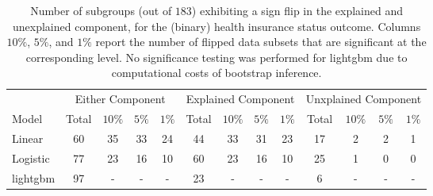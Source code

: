 % 
\begin{table}[!ht]
    \caption{Number of subgroups (out of $183$) exhibiting a sign flip in the explained and unexplained component, for the (binary) health insurance status outcome. Columns $10\%$, $5\%$, and $1\%$ report the number of flipped data subsets that are significant at the corresponding level. No significance testing was performed for lightgbm due to computational costs of bootstrap inference.}
    \label{tab:flips_census_insurance}
    \centering
    \small
    \begin{tabular}{l*{12}{c}}
    \toprule
          & \multicolumn{4}{c}{Either Component} & \multicolumn{4}{c}{Explained Component} & \multicolumn{4}{c}{Unxplained Component} \\
          \cmidrule(lr){2-5} \cmidrule(lr){6-9} \cmidrule(lr){10-13}
    Model       & Total & $10\%$ & $5\%$ & $1\%$ & Total & $10\%$ & $5\%$ & $1\%$ & Total & $10\%$ & $5\%$ & $1\%$ \\
    \midrule
    Linear      & 60 & 35 & 33 & 24 & 44 & 33 & 31 & 23 & 17 & 2 & 2 & 1 \\
    Logistic    & 77 & 23 & 16 & 10 & 60 & 23 & 16 & 10 & 25 & 1 & 0 & 0 \\
    lightgbm    & 97 & -  & -  & -  & 23 & -  & - & - & 6  & - & - & - \\
    \bottomrule
    \end{tabular}
\end{table}
